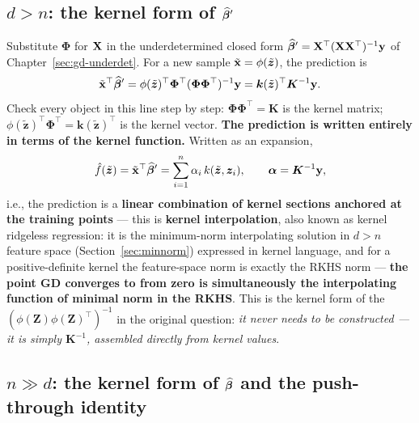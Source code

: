 \subsection[$d > n$: kernel form of the underdetermined closed form]{$d > n$: the kernel form of $\widehat{\bm{\beta}}'$}\label{sec:kernel-underdet}

Substitute $\bm{\Phi}$ for $\mathbf{X}$ in the underdetermined closed form $\widehat{\bm{\beta}}' = \mathbf{X}^\top(\mathbf{X}\mathbf{X}^\top)^{-1}\mathbf{y}$ of Chapter~\ref{sec:gd-underdet}. For a new sample $\tilde{\mathbf{x}} = \phi(\tilde{\bm{z}})$, the prediction is
\begin{equation}\label{eq:kernel-interp}
  \tilde{\mathbf{x}}^\top \widehat{\bm{\beta}}'
  = \phi(\tilde{\bm{z}})^\top \bm{\Phi}^\top (\bm{\Phi}\bm{\Phi}^\top)^{-1} \mathbf{y}
  = \bm{k}(\tilde{\bm{z}})^\top \bm{K}^{-1} \mathbf{y} .
\end{equation}
Check every object in this line step by step: $\bm{\Phi}\bm{\Phi}^\top = \bm{K}$ is the kernel matrix; $\phi(\tilde{\bm{z}})^\top \bm{\Phi}^\top = \bm{k}(\tilde{\bm{z}})^\top$ is the kernel vector. \textbf{The prediction is written entirely in terms of the kernel function.} Written as an expansion,
\begin{equation}\label{eq:kernel-expansion}
  \hat{f}(\tilde{\bm{z}}) = \tilde{\mathbf{x}}^\top \widehat{\bm{\beta}}' = \sum_{i=1}^n \alpha_i\, k(\tilde{\bm{z}}, \bm{z}_i),
  \qquad
  \bm{\alpha} = \bm{K}^{-1} \mathbf{y} ,
\end{equation}
i.e., the prediction is a \textbf{linear combination of kernel sections anchored at the training points} --- this is \textbf{kernel interpolation}, also known as kernel ridgeless regression: it is the minimum-norm interpolating solution in $d > n$ feature space (Section~\ref{sec:minnorm}) expressed in kernel language, and for a positive-definite kernel the feature-space norm is exactly the RKHS norm --- \textbf{the point GD converges to from zero is simultaneously the interpolating function of minimal norm in the RKHS}\cite{kimeldorf1970}. This is the kernel form of the $(\phi(\bm{Z})\phi(\bm{Z})^\top)^{-1}$ in the original question: \textit{it never needs to be constructed --- it is simply $\bm{K}^{-1}$, assembled directly from kernel values}.

\subsection[Kernel form of the OLS closed form and the push-through identity]{$n \gg d$: the kernel form of $\widehat{\bm{\beta}}$ and the push-through identity}\label{sec:kernel-overdet}

